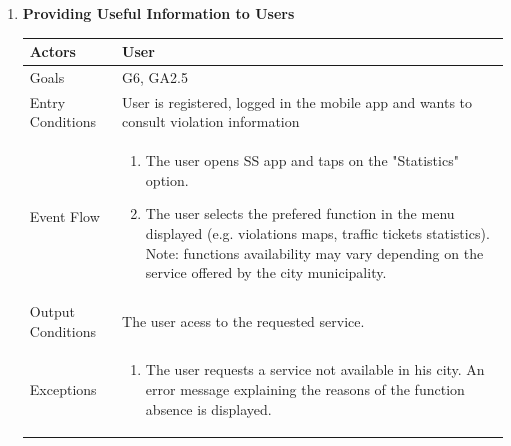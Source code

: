 \begin{enumerate}
	\item \textbf{Providing Useful Information to Users}
		\begin{table}[h!]
		\centering
		\begin{tabular}{|l|p{}|}
		\hline
		Actors            			&       	User\\ \hline
		Goals             			&         G6, GA2.5\\ \hline
		Entry Conditions  	&  		User is registered, logged in the mobile app and wants to consult violation information\\ \hline
		Event Flow        		&          
				\begin{enumerate}[label=\alph*)]
					\item The user opens SS app and taps on the "Statistics" option.
					\item The user selects the prefered function in the menu displayed (e.g. violations maps, traffic tickets statistics). \newline
								Note: functions availability may vary depending on the service offered by the city municipality.
				\end{enumerate}\\ \hline
		Output Conditions &    		The user acess to the requested service.\\ \hline		
				
		Exceptions        		&       	
				\begin{enumerate}[label=\alph*)]
					\item The user requests a service not available in his city. An error message explaining the reasons of the function absence is displayed.
				\end{enumerate}\\ \hline
	\end{tabular}
	\end{table}
	

\end{enumerate}
